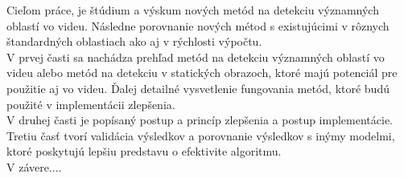 Cieľom práce, je štúdium a výskum nových metód na detekciu významných oblastí vo videu.
Následne porovnanie nových métod s existujúcimi v rôznych štandardných oblastiach ako aj v rýchlosti výpočtu.
\\
V prvej časti sa nachádza prehľad metód na detekciu významných oblastí vo videu alebo metód na detekciu v statických obrazoch, ktoré majú potenciál pre použitie aj vo videu.
Ďalej detailné vysvetlenie fungovania metód, ktoré budú použité v implementácii zlepšenia.
\\
V druhej časti je popísaný postup a princíp zlepšenia a postup implementácie.
Tretiu časť tvorí validácia výsledkov a porovnanie výsledkov s inýmy modelmi, ktoré poskytujú lepšiu predstavu o efektivite algoritmu.
\\
V závere....
